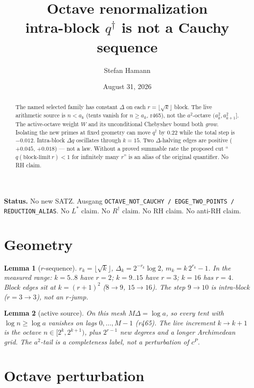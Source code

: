 \documentclass[11pt]{article}
\title{\bfseries Octave renormalization\\[2mm]
\large intra-block $q^{\dagger}$ is not a Cauchy sequence}
\author{Stefan Hamann}
\date{August 31, 2026}
\newtheorem{lemma}{Lemma}
\begin{document}
\maketitle

\begin{abstract}\noindent
The named selected family has constant $\Delta$ on each
$r=\lfloor\sqrt k\rfloor$ block.
The live arithmetic source is $n<a_k$ (tents vanish for
$n\ge a_k$, r465), not the $a^2$-octave
$(a_k^2,a_{k+1}^2]$.
The active-octave weight $W$ and its unconditional
Chebyshev bound both \emph{grow}.
Isolating the new primes at fixed geometry can move
$q^{\dagger}$ by $0.22$ while the total step is
$-0.012$.
Intra-block $\Delta q$ oscillates through $k=15$.
Two $\Delta$-halving edges are positive
($+0.045$, $+0.018$) --- not a law.
Without a proved summable rate the proposed cut
``$q(\mathrm{block\text{-}limit}\,r)<1$ for infinitely
many $r$'' is an alias of the original quantifier.
No RH claim.
\end{abstract}

\medskip\noindent
\textbf{Status.}\enspace
No new SATZ.
Ausgang
\texttt{OCTAVE\_NOT\_CAUCHY / EDGE\_TWO\_POINTS / REDUCTION\_ALIAS}.
No $L^{*}$ claim.  No $R^{\dagger}$ claim.
No RH claim.  No anti-RH claim.

\section{Geometry}\label{sec:geom}

\begin{lemma}[$r$-sequence]\label{lem:r}
$r_k=\lfloor\sqrt k\rfloor$,
$\Delta_k=2^{-r_k}\log 2$,
$m_k=k\,2^{r_k}-1$.
In the measured range:
$k=5..8$ have $r=2$;
$k=9..15$ have $r=3$;
$k=16$ has $r=4$.
Block edges sit at $k=(r+1)^2$
($8\to9$, $15\to16$).
The step $9\to10$ is intra-block
($r=3\to3$), not an $r$-jump.
\end{lemma}

\begin{lemma}[active source]\label{lem:active}
On this mesh $M\Delta=\log a$, so every tent with
$\log n\ge\log a$ vanishes on lags $0,\ldots,M-1$
(r465).
The live increment $k\to k+1$ is the octave
$n\in[2^k,2^{k+1})$, plus $2^{r-1}$ new degrees
and a longer Archimedean grid.
The $a^2$-tail is a completeness label, not a
perturbation of $c^P$.
\end{lemma}

\section{Octave perturbation}\label{sec:A}
\end{document}
